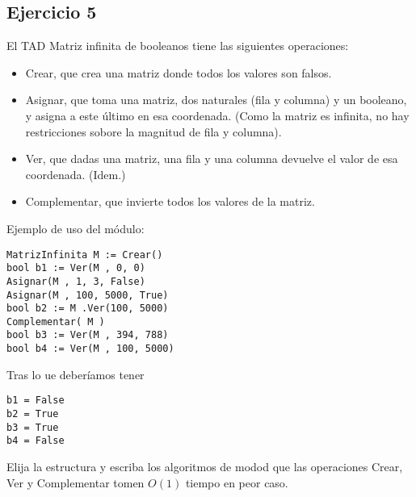 \subsection{Ejercicio 5}
El TAD Matriz infinita de booleanos tiene las siguientes operaciones:
\begin{itemize}
	\item Crear, que crea una matriz donde todos los valores son falsos.
	\item Asignar, que toma una matriz, dos naturales (fila y columna) y un booleano, y asigna a este último en esa coordenada. (Como la matriz es infinita, no hay restricciones sobore la magnitud de fila y columna).
	\item Ver, que dadas una matriz, una fila y una columna devuelve el valor de esa coordenada. (Idem.)
	\item Complementar, que invierte todos los valores de la matriz.
\end{itemize}
\bigskip

\begin{minipage}[t]{0.45\textwidth}
	Ejemplo de uso del módulo:
	\begin{lstlisting}[numbers=none,frame=none]
MatrizInfinita M := Crear()
bool b1 := Ver(M , 0, 0)
Asignar(M , 1, 3, False)
Asignar(M , 100, 5000, True)
bool b2 := M .Ver(100, 5000)
Complementar( M )
bool b3 := Ver(M , 394, 788)
bool b4 := Ver(M , 100, 5000)
	\end{lstlisting}
\end{minipage}
\begin{minipage}[t]{0.45\textwidth}
	Tras lo ue deberíamos tener
	\begin{lstlisting}[numbers=none,frame=none]
b1 = False
b2 = True
b3 = True
b4 = False
	\end{lstlisting}
\end{minipage}

Elija la estructura y escriba los algoritmos de modod que las operaciones Crear, Ver y Complementar tomen $O(1)$ tiempo en peor caso.

